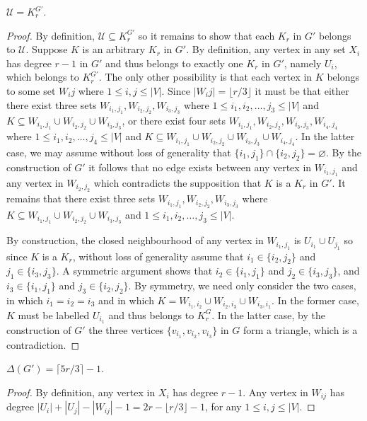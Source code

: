 \begin{lem}
\label{lem:krpacking_lissetofkrs}
$\mathcal{U} = K_r^{G'}$.
\end{lem}
\begin{proof}
By definition, $\mathcal{U} \subseteq K_r^{G'}$ so it remains to show that each $K_r$ in $G'$ belongs to $\mathcal{U}$. Suppose $K$ is an arbitrary $K_r$ in $G'$. By definition, any vertex in any set $X_i$ has degree $r-1$ in $G'$ and thus belongs to exactly one $K_r$ in $G'$, namely $U_i$, which belongs to $K_r^{G'}$. The only other possibility is that each vertex in $K$ belongs to some set $W_ij$ where $1\leq i, j \leq |V|$. Since $|W_ij| = \lfloor r/3 \rfloor$ it must be that either there exist three sets $W_{i_1, j_1}, W_{i_2, j_2}, W_{i_3, j_3}$ where $1\leq i_1, i_2, \dots, j_3 \leq |V|$ and $K \subseteq W_{i_1, j_1} \cup W_{i_2, j_2} \cup W_{i_3, j_3}$, or there exist four sets $W_{i_1, j_1}, W_{i_2, j_2}, W_{i_3, j_3}, W_{i_4, j_4}$ where $1\leq i_1, i_2, \dots, j_4 \leq |V|$ and $K \subseteq W_{i_1, j_1} \cup W_{i_2, j_2} \cup W_{i_3, j_3} \cup W_{i_4, j_4}$. In the latter case, we may assume without loss of generality that $\{ i_1, j_1 \} \cap \{ i_2, j_2 \} = \varnothing$. By the construction of $G'$ it follows that no edge exists between any vertex in $W_{i_1, j_1}$ and any vertex in $W_{i_2, j_2}$ which contradicts the supposition that $K$ is a $K_r$ in $G'$. It remains that there exist three sets $W_{i_1, j_1}, W_{i_2, j_2}, W_{i_3, j_3}$ where $K \subseteq W_{i_1, j_1} \cup W_{i_2, j_2} \cup W_{i_3, j_3}$ and $1\leq i_1, i_2, \dots, j_3 \leq |V|$.

By construction, the closed neighbourhood of any vertex in $W_{i_1, j_1}$ is $U_{i_1} \cup U_{j_1}$ so since $K$ is a $K_r$, without loss of generality assume that $i_1 \in \{ i_2, j_2 \}$ and $j_1 \in \{ i_3, j_3 \}$. A symmetric argument shows that $i_2 \in \{ i_1, j_1 \}$ and $j_2 \in \{ i_3, j_3 \}$, and $i_3 \in \{ i_1, j_1 \}$ and $j_3 \in \{ i_2, j_2 \}$. By symmetry, we need only consider the two cases, in which $i_1 = i_2 = i_3$ and in which $K = W_{i_1, i_2} \cup W_{i_2, i_3} \cup W_{i_3, i_1}$. In the former case, $K$ must be labelled $U_{i_1}$ and thus belongs to $K_r^G$. In the latter case, by the construction of $G'$ the three vertices $\{ v_{i_1}, v_{i_2}, v_{i_3} \}$ in $G$ form a triangle, which is a contradiction.
\end{proof}

\begin{lem}
\label{lem:krpacking_vdkr_reduction_degree}
$\Delta(G') = \lceil 5r/3 \rceil - 1$.
\end{lem}
\begin{proof}
By definition, any vertex in $X_i$ has degree $r-1$. Any vertex in $W_{ij}$ has degree $|U_i| + |U_j| - |W_{ij}| - 1 = 2r - \lfloor r/3 \rfloor - 1$, for any $1\leq i, j \leq |V|$.
\end{proof}

